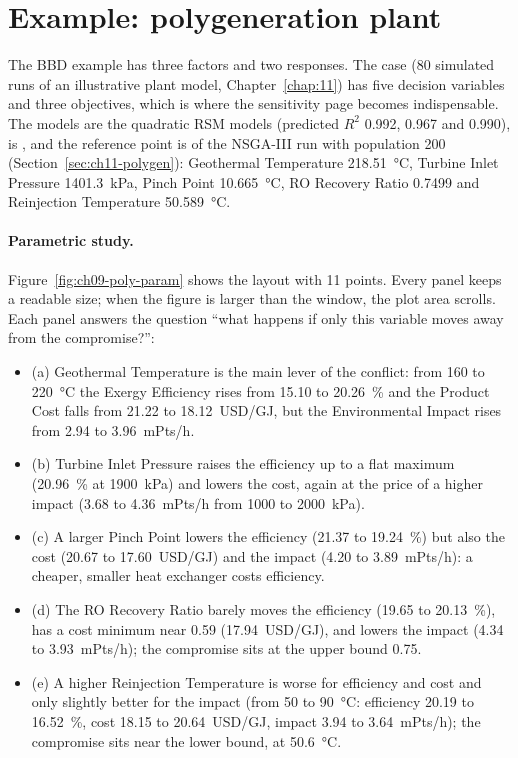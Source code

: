 \section{Example: polygeneration plant}
\label{sec:ch09-polygen}
The BBD example has three factors and two responses. The case  (80 simulated
runs of an illustrative plant model, Chapter~\ref{chap:11}) has five decision variables and three objectives, which is
where the sensitivity page becomes indispensable. The models are the quadratic RSM models (predicted $R^2$ 0.992, 0.967
and 0.990),  is , and the reference point is  of the
NSGA-III run with population 200 (Section~\ref{sec:ch11-polygen}): Geothermal Temperature 218.51~°C, Turbine Inlet
Pressure 1401.3~kPa, Pinch Point 10.665~°C, RO Recovery Ratio 0.7499 and Reinjection Temperature 50.589~°C.

\paragraph{Parametric study.} Figure~\ref{fig:ch09-poly-param} shows the layout  with
11 points. Every panel keeps a readable size; when the figure is larger than the window, the plot area scrolls. Each
panel answers the question ``what happens if only this variable moves away
from the compromise?'':
\begin{itemize}
  \item (a) Geothermal Temperature is the main lever of the conflict: from 160 to 220~°C the Exergy Efficiency rises
        from 15.10 to 20.26~\% and the Product Cost falls from 21.22 to 18.12~USD/GJ, but the Environmental Impact rises
        from 2.94 to 3.96~mPts/h.
  \item (b) Turbine Inlet Pressure raises the efficiency up to a flat maximum (20.96~\% at 1900~kPa) and lowers the
        cost, again at the price of a higher impact (3.68 to 4.36~mPts/h from 1000 to 2000~kPa).
  \item (c) A larger Pinch Point lowers the efficiency (21.37 to 19.24~\%) but also the cost (20.67 to
        17.60~USD/GJ) and the impact (4.20 to 3.89~mPts/h): a cheaper, smaller heat exchanger costs efficiency.
  \item (d) The RO Recovery Ratio barely moves the efficiency (19.65 to 20.13~\%), has a cost minimum near 0.59
        (17.94~USD/GJ), and lowers the impact (4.34 to 3.93~mPts/h); the compromise sits at the upper bound 0.75.
  \item (e) A higher Reinjection Temperature is worse for efficiency and cost and only slightly better for the impact
        (from 50 to 90~°C: efficiency 20.19 to 16.52~\%, cost 18.15 to 20.64~USD/GJ, impact 3.94 to 3.64~mPts/h); the
        compromise sits near the lower bound, at 50.6~°C.
\end{itemize}

